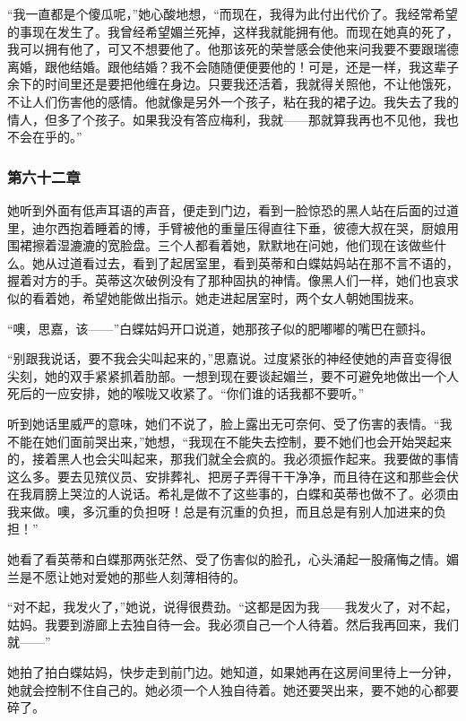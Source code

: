 \par “我一直都是个傻瓜呢，”她心酸地想，“而现在，我得为此付出代价了。我经常希望的事现在发生了。我曾经希望媚兰死掉，这样我就能拥有他。而现在她真的死了，我可以拥有他了，可又不想要他了。他那该死的荣誉感会使他来问我要不要跟瑞德离婚，跟他结婚。跟他结婚？我不会随随便便要他的！可是，还是一样，我这辈子余下的时间里还是要把他缠在身边。只要我还活着，我就得关照他，不让他饿死，不让人们伤害他的感情。他就像是另外一个孩子，粘在我的裙子边。我失去了我的情人，但多了个孩子。如果我没有答应梅利，我就——那就算我再也不见他，我也不会在乎的。”

\subsubsection{第六十二章}

\par 她听到外面有低声耳语的声音，便走到门边，看到一脸惊恐的黑人站在后面的过道里，迪尔西抱着睡着的博，手臂被他的重量压得直往下垂，彼德大叔在哭，厨娘用围裙擦着湿漉漉的宽脸盘。三个人都看着她，默默地在问她，他们现在该做些什么。她从过道看过去，看到了起居室里，看到英蒂和白蝶姑妈站在那不言不语的，握着对方的手。英蒂这次破例没有了那种固执的神情。像黑人们一样，她们也哀求似的看着她，希望她能做出指示。她走进起居室时，两个女人朝她围拢来。
\par “噢，思嘉，该——”白蝶姑妈开口说道，她那孩子似的肥嘟嘟的嘴巴在颤抖。
\par “别跟我说话，要不我会尖叫起来的，”思嘉说。过度紧张的神经使她的声音变得很尖刻，她的双手紧紧抓着肋部。一想到现在要谈起媚兰，要不可避免地做出一个人死后的一应安排，她的喉咙又收紧了。“你们谁的话我都不要听。”
\par 听到她话里威严的意味，她们不说了，脸上露出无可奈何、受了伤害的表情。“我不能在她们面前哭出来，”她想，“我现在不能失去控制，要不她们也会开始哭起来的，接着黑人也会尖叫起来，那我们就全会疯的。我必须振作起来。我要做的事情这么多。要去见殡仪员、安排葬礼、把房子弄得干干净净，而且待在这和那些会伏在我肩膀上哭泣的人说话。希礼是做不了这些事的，白蝶和英蒂也做不了。必须由我来做。噢，多沉重的负担呀！总是有沉重的负担，而且总是有别人加进来的负担！”
\par 她看了看英蒂和白蝶那两张茫然、受了伤害似的脸孔，心头涌起一股痛悔之情。媚兰是不愿让她对爱她的那些人刻薄相待的。
\par “对不起，我发火了，”她说，说得很费劲。“这都是因为我——我发火了，对不起，姑妈。我要到游廊上去独自待一会。我必须自己一个人待着。然后我再回来，我们就——”
\par 她拍了拍白蝶姑妈，快步走到前门边。她知道，如果她再在这房间里待上一分钟，她就会控制不住自己的。她必须一个人独自待着。她还要哭出来，要不她的心都要碎了。
